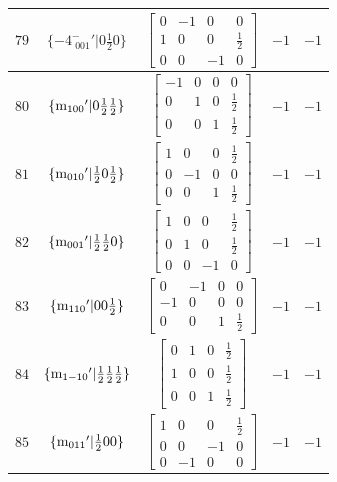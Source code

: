 \documentclass[fleqn,8pt]{jsarticle}
\begin{document}
\begin{longtable}{ccccc}
$ 79 $ & $ \{-4^{-}_{\,\,001}{}'|0 \frac{1}{2} 0\} $ & $ \begin{bmatrix} 0 & -1 & 0 & 0 \\ 1 & 0 & 0 & \frac{1}{2} \\ 0 & 0 & -1 & 0 \end{bmatrix} $ & $ -1 $ & $ -1 $ \\ \hline
$ 80 $ & $ \{{\rm m}_{100}{}'|0 \frac{1}{2} \frac{1}{2}\} $ & $ \begin{bmatrix} -1 & 0 & 0 & 0 \\ 0 & 1 & 0 & \frac{1}{2} \\ 0 & 0 & 1 & \frac{1}{2} \end{bmatrix} $ & $ -1 $ & $ -1 $ \\ \hline
$ 81 $ & $ \{{\rm m}_{010}{}'|\frac{1}{2} 0 \frac{1}{2}\} $ & $ \begin{bmatrix} 1 & 0 & 0 & \frac{1}{2} \\ 0 & -1 & 0 & 0 \\ 0 & 0 & 1 & \frac{1}{2} \end{bmatrix} $ & $ -1 $ & $ -1 $ \\ \hline
$ 82 $ & $ \{{\rm m}_{001}{}'|\frac{1}{2} \frac{1}{2} 0\} $ & $ \begin{bmatrix} 1 & 0 & 0 & \frac{1}{2} \\ 0 & 1 & 0 & \frac{1}{2} \\ 0 & 0 & -1 & 0 \end{bmatrix} $ & $ -1 $ & $ -1 $ \\ \hline
$ 83 $ & $ \{{\rm m}_{110}{}'|0 0 \frac{1}{2}\} $ & $ \begin{bmatrix} 0 & -1 & 0 & 0 \\ -1 & 0 & 0 & 0 \\ 0 & 0 & 1 & \frac{1}{2} \end{bmatrix} $ & $ -1 $ & $ -1 $ \\ \hline
$ 84 $ & $ \{{\rm m}_{1-10}{}'|\frac{1}{2} \frac{1}{2} \frac{1}{2}\} $ & $ \begin{bmatrix} 0 & 1 & 0 & \frac{1}{2} \\ 1 & 0 & 0 & \frac{1}{2} \\ 0 & 0 & 1 & \frac{1}{2} \end{bmatrix} $ & $ -1 $ & $ -1 $ \\ \hline
$ 85 $ & $ \{{\rm m}_{011}{}'|\frac{1}{2} 0 0\} $ & $ \begin{bmatrix} 1 & 0 & 0 & \frac{1}{2} \\ 0 & 0 & -1 & 0 \\ 0 & -1 & 0 & 0 \end{bmatrix} $ & $ -1 $ & $ -1 $ \\ \hline

\end{longtable}
\end{document}
